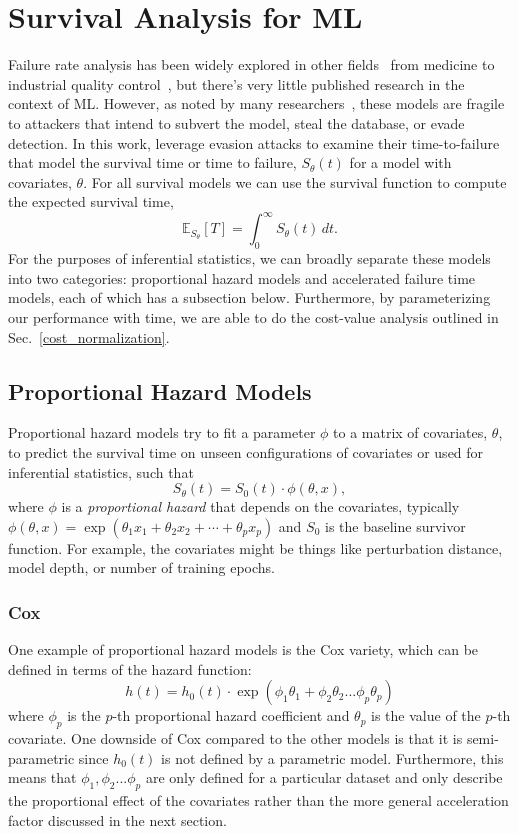 
\section{Survival Analysis for ML} 
\label{afr_models}
Failure rate analysis has been widely explored in other fields~\cite{aft_models} from medicine to industrial quality control~\cite{ai_medical_imaging,ai_industry,ai_aviation,ai_luggage,ai_security,ai_prison}, but there's very little published research in the context of ML. However, as noted by many researchers~\cite{madry2017towards, carlini_towards_2017, croce_reliable_2020, meyers}, these models are fragile to attackers that intend to subvert the model, steal the database, or evade detection.  In this work, leverage evasion attacks to examine their time-to-failure   that model the survival time or time to failure, $S_{\theta}(t)$ for a model with covariates, $\theta$. For all survival models we can use the survival function to compute the expected survival time,
\[
	\mathbb{E}_{S_\theta}[T] = \int_0^{\infty}S_\theta(t) \,dt.
\]
For the purposes of inferential statistics, we can broadly separate these models into two categories: proportional hazard models and accelerated failure time models, each of which has a subsection below. Furthermore, by parameterizing our performance with time, we are able to do the cost-value analysis outlined in Sec.~\ref{cost_normalization}.

\subsection{Proportional Hazard Models}
Proportional hazard models try to fit a parameter $\phi$ to a matrix of covariates, $\theta$, to predict the survival time on unseen configurations of covariates or used for inferential statistics, such that
$$
S_\theta(t) = S_0(t) \cdot \phi(\theta, x), 
$$
where $\phi$ is a \textit{proportional hazard} that depends on the covariates, typically $\phi(\theta, x) = \exp{(\theta_1 x_1 + \theta_2 x_2 + \cdots + \theta_p x_p)}$ and $S_0$ is the baseline survivor function. For example, the covariates might be things like perturbation distance, model depth, or number of training epochs.


\subsubsection{Cox}
One example of proportional hazard models is the Cox variety, which can be defined in terms of the hazard function:
$$
h(t) = h_0(t) \cdot \exp(\phi_1 \theta_1 + \phi_2 \theta_2... \phi_p \theta_p)
$$
where $\phi_p$ is the $p$-th proportional hazard coefficient and $\theta_p$ is the value of the $p$-th covariate. One downside of Cox compared to the other models is that it is semi-parametric since $h_0(t)$ is not defined by a parametric model. Furthermore, this means that $\phi_1, \phi_2... \phi_p$ are only defined for a particular dataset and only describe the proportional effect of the covariates rather than the more general acceleration factor discussed in the next section.


